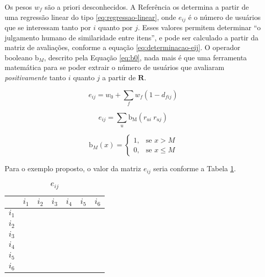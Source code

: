 Os pesos $w_f$ são a priori desconhecidos. A Referência  os determina a partir de uma regressão linear do tipo \ref{eq:regressao-linear}, onde $e_{ij}$ é o número de usuários que se interessam tanto por $i$ quanto por $j$. Esses valores permitem determinar ``o julgamento humano de similaridade entre itens'', e pode ser calculado a partir da matriz de avaliações, conforme a equação \ref{eq:determinacao-eij}. O operador booleano $\mathrm{b}_M$, descrito pela Equação \ref{eq:b0}, nada mais é que uma ferramenta matemática para se poder extrair o número de usuários que avaliaram \textit{positivamente} tanto $i$ quanto $j$ a partir de $\mathbf{R}$. 


\begin{equation}
\label{eq:regressao-linear} 
    e_{ij} = w_0 + \sum_{f}{w_{f} \left(1-d_{fij}\right)}
\end{equation} 


\begin{equation}
\label{eq:determinacao-eij} 
    e_{ij} = \sum_{u}{\mathrm{b_M}\left(r_{ui} ~ r_{uj}\right)}
\end{equation} 

\begin{equation}
\label{eq:b0}
\mathrm{b}_M\left(x\right) = 
\begin{cases}
1, &\text{se }x>M \\
0, &\text{se }x\leq M
\end{cases} 
\end{equation}


Para o exemplo proposto, o valor da matriz $e_{ij}$ seria conforme a Tabela \ref{tab:eij_fw}.

\begin{table}[Hb]
\begin{center}
    \caption{$e_{ij}$}
    \label{tab:eij_fw}
    \begin{tabular}{ | c | c | c | c | c | c | c | } 
    \hline
     & $i_1$ & $i_2$ & $i_3$ & $i_4$ & $i_5$ & $i_6$  \\ \hline
     $i_1$ &  &  &  & & &  \\ \hline
     $i_2$ &  &  &  & & &  \\ \hline
     $i_3$ &  &  &  & & &  \\ \hline
     $i_4$ &  &  &  & & &  \\ \hline
     $i_5$ &  &  &  & & &  \\ \hline
     $i_6$ &  &  &  & & &  \\ \hline
    \end{tabular}
\end{center}
\end{table}

